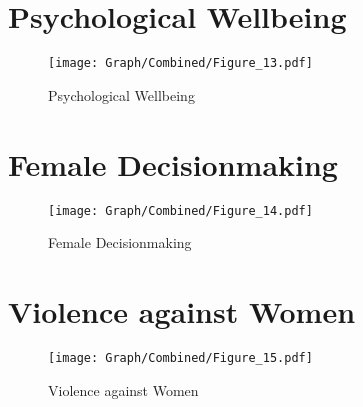 \documentclass[10pt,a4paper]{article}
\begin{document}
\section{Psychological Wellbeing}
\begin{table}[H]\centering

\end{table}
\begin{figure}[H]\centering
\texttt{[image: Graph/Combined/Figure\_13.pdf]}
\caption{Psychological Wellbeing} \label{fig:Fig_13}
\end{figure}
\begin{table}[H]\centering

\end{table}
\pagebreak
\section{Female Decisionmaking}
\begin{table}[H]\centering

\end{table}
\begin{figure}[H]\centering
\texttt{[image: Graph/Combined/Figure\_14.pdf]}
\caption{Female Decisionmaking} \label{fig:Fig_14}
\end{figure}
\begin{table}[H]\centering

\end{table}
\pagebreak
\section{Violence against Women}
\begin{table}[H]\centering

\end{table}
\begin{figure}[H]\centering
\texttt{[image: Graph/Combined/Figure\_15.pdf]}
\caption{Violence against Women} \label{fig:Fig_15}
\end{figure}
\begin{table}[H]\centering

\end{table}
\pagebreak
\end{document}
